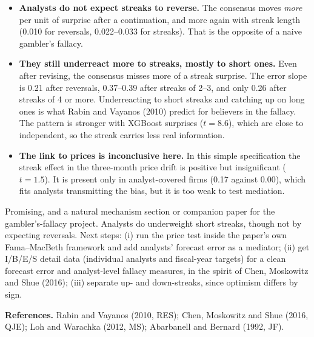 \begin{itemize}
\item \textbf{Analysts do not expect streaks to reverse.} The consensus moves \emph{more} per unit of surprise after a
  continuation, and more again with streak length (0.010 for reversals, 0.022--0.033 for streaks). That is the
  opposite of a naive gambler's fallacy.
\item \textbf{They still underreact more to streaks, mostly to short ones.} Even after revising, the consensus misses
  more of a streak surprise. The error slope is 0.21 after reversals, 0.37--0.39 after streaks of 2--3, and only 0.26
  after streaks of 4 or more. Underreacting to short streaks and catching up on long ones is what
  Rabin and Vayanos (2010) predict for believers in the fallacy. The pattern is stronger with XGBoost surprises
  ($t=8.6$), which are close to independent, so the streak carries less real information.
\item \textbf{The link to prices is inconclusive here.} In this simple specification the streak effect in the
  three-month price drift is positive but insignificant ($t=1.5$). It is present only in analyst-covered firms (0.17
  against 0.00), which fits analysts transmitting the bias, but it is too weak to test mediation.
\end{itemize}

Promising, and a natural mechanism section or companion paper for the gambler's-fallacy project. Analysts do
underweight short streaks, though not by expecting reversals. Next steps: (i) run the price test inside the
paper's own Fama--MacBeth framework and add analysts' forecast error as a mediator; (ii) get I/B/E/S detail data
(individual analysts and fiscal-year targets) for a clean forecast error and analyst-level fallacy measures, in the
spirit of Chen, Moskowitz and Shue (2016); (iii) separate up- and down-streaks, since optimism differs by sign.

{\footnotesize \textbf{References.} Rabin and Vayanos (2010, RES); Chen, Moskowitz and Shue (2016,
QJE); Loh and Warachka (2012, MS); Abarbanell and Bernard (1992, JF).}

